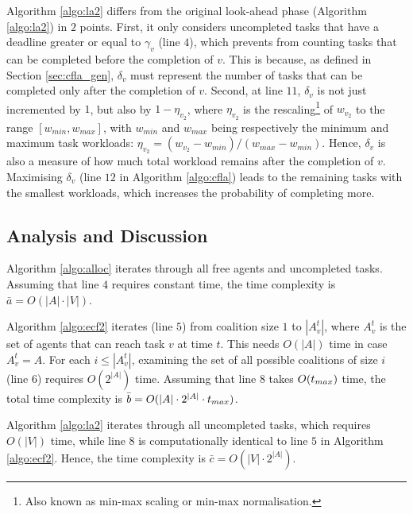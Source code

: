Algorithm \ref{algo:la2} differs from the original look-ahead phase (Algorithm
\ref{algo:la2}) in $2$ points. First, it only considers uncompleted tasks that have a
deadline greater or equal to $\gamma_v$ (line $4$), which prevents from counting tasks that can
be completed before the completion of $v$.
This is because, as defined in Section \ref{sec:cfla_gen}, $\delta_v$ must represent the
number of tasks that can be completed only after the completion of $v$.
Second, at line $11$, $\delta_v$ is not just incremented by $1$, but also by $1 -
\eta_{v_2}$, where $\eta_{v_2}$ is the rescaling\footnote{Also known as min-max scaling or
min-max normalisation.} of $w_{v_2}$ to the range $[w_{min}, w_{max}]$, with $w_{min}$ and
$w_{max}$ being respectively the minimum and maximum task workloads:
$\eta_{v_2} = \left( w_{v_2} - w_{min} \right) / \left(w_{max} - w_{min} \right)$.
Hence, $\delta_v$ is also a measure of how much total workload remains after the
completion of $v$. Maximising $\delta_v$ (line $12$ in Algorithm \ref{algo:cfla}) leads to
the remaining tasks with the smallest workloads, which increases the probability of
completing more.

\subsection{Analysis and Discussion}\label{sec:an1}

Algorithm \ref{algo:alloc} iterates through all free agents and uncompleted tasks.
Assuming that line $4$ requires constant time, the time complexity is $\bar{a} = O(|A|
\cdot |V|)$.

Algorithm \ref{algo:ecf2} iterates (line $5$) from coalition size $1$ to $|A^t_v|$, where
$A^t_v$ is the set of agents that can reach task $v$ at time $t$. This needs $O(|A|)$
time in case $A^t_v = A$. For each $i \leq |A^t_v|$, examining the set of all possible
coalitions of size $i$ (line $6$) requires $O(2^{|A|})$ time. Assuming that line $8$
takes $O(t_{max})$ time, the total time complexity is $\bar{b} = O(|A| \cdot 2^{|A|}
\cdot t_{max})$.

Algorithm \ref{algo:la2} iterates through all uncompleted tasks, which requires $O(|V|)$
time, while line $8$ is computationally identical to line $5$ in Algorithm \ref{algo:ecf2}.
Hence, the time complexity is $\bar{c} = O(|V| \cdot 2^{|A|})$.

